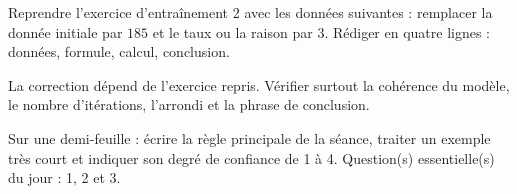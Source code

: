 
\begin{homework}Reprendre l'exercice d'entraînement 2 avec les données suivantes : remplacer la donnée initiale par $185$ et le taux ou la raison par $3$. Rédiger en quatre lignes : données, formule, calcul, conclusion.\end{homework}
\begin{solution}La correction dépend de l'exercice repris. Vérifier surtout la cohérence du modèle, le nombre d'itérations, l'arrondi et la phrase de conclusion.\end{solution}

\begin{exitticket}[3 minutes]Sur une demi-feuille : écrire la règle principale de la séance, traiter un exemple très court et indiquer son degré de confiance de 1 à 4. Question(s) essentielle(s) du jour : 1, 2 et 3.\end{exitticket}

